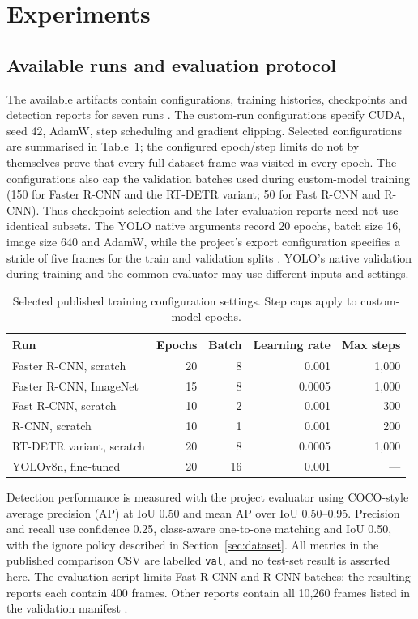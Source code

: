 \section{Experiments}
\label{sec:experiments}
\subsection{Available runs and evaluation protocol}
The available artifacts contain configurations, training histories, checkpoints and detection reports for seven runs \cite{comparison,repository}. The custom-run configurations specify CUDA, seed 42, AdamW, step scheduling and gradient clipping. Selected configurations are summarised in Table~\ref{tab:training}; the configured epoch/step limits do not by themselves prove that every full dataset frame was visited in every epoch. The configurations also cap the validation batches used during custom-model training (150 for Faster R-CNN and the RT-DETR variant; 50 for Fast R-CNN and R-CNN). Thus checkpoint selection and the later evaluation reports need not use identical subsets. The YOLO native arguments record 20 epochs, batch size 16, image size 640 and AdamW, while the project's export configuration specifies a stride of five frames for the train and validation splits \cite{yoloargs,yoloconfig}. YOLO's native validation during training and the common evaluator may use different inputs and settings.

\begin{table}[htbp]
\centering
\caption{Selected published training configuration settings. Step caps apply to custom-model epochs.}
\label{tab:training}
\begin{tabular}{lrrrr}
\toprule
Run & Epochs & Batch & Learning rate & Max steps \\
\midrule
Faster R-CNN, scratch & 20 & 8 & 0.001 & 1,000 \\
Faster R-CNN, ImageNet & 15 & 8 & 0.0005 & 1,000 \\
Fast R-CNN, scratch & 10 & 2 & 0.001 & 300 \\
R-CNN, scratch & 10 & 1 & 0.001 & 200 \\
RT-DETR variant, scratch & 20 & 8 & 0.0005 & 1,000 \\
YOLOv8n, fine-tuned & 20 & 16 & 0.001 & --- \\
\bottomrule
\end{tabular}
\end{table}

Detection performance is measured with the project evaluator using COCO-style average precision (AP) at IoU 0.50 and mean AP over IoU 0.50--0.95. Precision and recall use confidence 0.25, class-aware one-to-one matching and IoU 0.50, with the ignore policy described in Section~\ref{sec:dataset}. All metrics in the published comparison CSV are labelled \texttt{val}, and no test-set result is asserted here. The evaluation script limits Fast R-CNN and R-CNN batches; the resulting reports each contain 400 frames. Other reports contain all 10,260 frames listed in the validation manifest \cite{evaluationcode,evalscript,comparison}.

